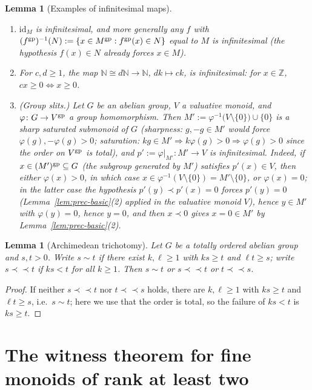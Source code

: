 \documentclass[11pt]{amsart}
\theoremstyle{plain}
\newtheorem{lemma}[theorem]{Lemma}
\theoremstyle{remark}
\theoremstyle{definition}
\numberwithin{equation}{section}
\begin{document}
\begin{lemma}[Examples of infinitesimal maps]\label{lem:inf-examples}
\begin{enumerate}
\item $\mathrm{id}_M$ is infinitesimal, and more generally any $f$ with
$(f^{\rm gp})^{-1}(N):=\{x\in M^{\rm gp}: f^{\rm gp}(x)\in N\}$ equal to
$M$ is infinitesimal (the hypothesis $f(x)\in N$ already forces
$x\in M$).
\item For $c,d\ge 1$, the map $\mathbb N\cong d\mathbb N\to\mathbb N$,
$dk\mapsto ck$, is infinitesimal: for $x\in\mathbb Z$,
$cx\ge 0\iff x\ge 0$.
\item (\emph{Group slits.})  Let $G$ be an abelian group,
$V$ a valuative monoid, and $\varphi\colon G\to V^{\rm gp}$ a group
homomorphism.  Then
$M':=\varphi^{-1}\big(V\setminus\{0\}\big)\cup\{0\}$
is a sharp saturated submonoid of $G$ (sharpness: $g,-g\in M'$ would force
$\varphi(g),-\varphi(g)>0$; saturation: $k g\in M'\Rightarrow
k\varphi(g)>0\Rightarrow\varphi(g)>0$ since the order on $V^{\rm gp}$ is
total), and $p':=\varphi|_{M'}\colon M'\to V$ is infinitesimal.  Indeed,
if $x\in (M')^{\rm gp}\subseteq G$ (the subgroup generated by $M'$)
satisfies $p'(x)\in V$, then either $\varphi(x)>0$, in which case
$x\in\varphi^{-1}(V\setminus\{0\})=M'\setminus\{0\}$, or $\varphi(x)=0$;
in the latter case the hypothesis $p'(y)\prec p'(x)=0$ forces
$p'(y)=0$ (Lemma~\ref{lem:prec-basic}(2) applied in the valuative monoid
$V$), hence $y\in M'$ with $\varphi(y)=0$, hence $y=0$, and then
$x\prec0$ gives $x=0\in M'$ by Lemma~\ref{lem:prec-basic}(2).
\end{enumerate}
\end{lemma}

\begin{lemma}[Archimedean trichotomy]\label{lem:trichotomy}
Let $G$ be a totally ordered abelian group and $s,t>0$.  Write
$s\sim t$ if there exist $k,\ell\ge1$ with $ks\ge t$ and $\ell t\ge s$;
write $s\prec\prec t$ if $ks<t$ for all $k\ge1$.  Then
$s\sim t$ or $s\prec\prec t$ or $t\prec\prec s$.
\end{lemma}
\begin{proof}
If neither $s\prec\prec t$ nor $t\prec\prec s$ holds, there are
$k,\ell\ge 1$ with $ks\ge t$ and $\ell t\ge s$, i.e.\ $s\sim t$; here we
use that the order is total, so the failure of $ks<t$ is $ks\ge t$.
\end{proof}

\section{The witness theorem for fine monoids of rank at least two}
\end{document}
